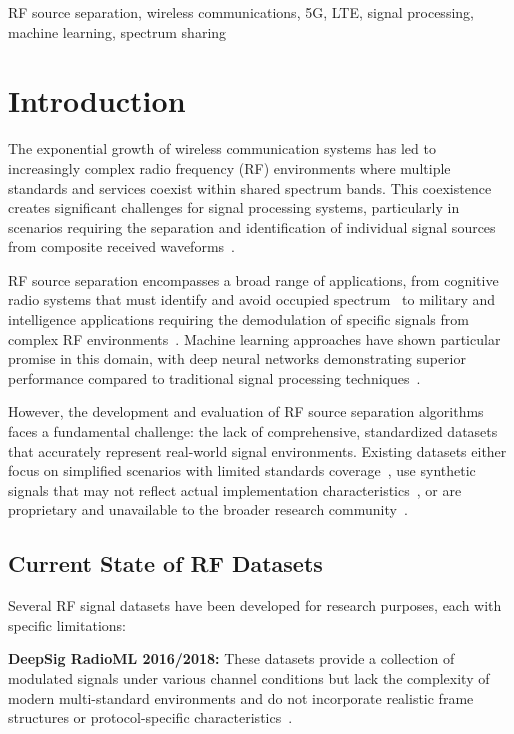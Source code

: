 \documentclass[conference]{IEEEtran}
\begin{document}
\begin{IEEEkeywords}
RF source separation, wireless communications, 5G, LTE, signal processing, machine learning, spectrum sharing
\end{IEEEkeywords}

\section{Introduction}

The exponential growth of wireless communication systems has led to increasingly complex radio frequency (RF) environments where multiple standards and services coexist within shared spectrum bands. This coexistence creates significant challenges for signal processing systems, particularly in scenarios requiring the separation and identification of individual signal sources from composite received waveforms~\cite{cabric2004implementation, mitola1999cognitive}.

RF source separation encompasses a broad range of applications, from cognitive radio systems that must identify and avoid occupied spectrum~\cite{haykin2005cognitive} to military and intelligence applications requiring the demodulation of specific signals from complex RF environments~\cite{goldsmith2009breaking}. Machine learning approaches have shown particular promise in this domain, with deep neural networks demonstrating superior performance compared to traditional signal processing techniques~\cite{oshea2017introduction, west2017deep}.

However, the development and evaluation of RF source separation algorithms faces a fundamental challenge: the lack of comprehensive, standardized datasets that accurately represent real-world signal environments. Existing datasets either focus on simplified scenarios with limited standards coverage~\cite{oshea2018over}, use synthetic signals that may not reflect actual implementation characteristics~\cite{oshea2016convolutional}, or are proprietary and unavailable to the broader research community~\cite{rajendran2018deep}.

\subsection{Current State of RF Datasets}

Several RF signal datasets have been developed for research purposes, each with specific limitations:

\textbf{DeepSig RadioML 2016/2018:} These datasets provide a collection of modulated signals under various channel conditions but lack the complexity of modern multi-standard environments and do not incorporate realistic frame structures or protocol-specific characteristics~\cite{oshea2016radio, west2017deep}.
\end{document}
